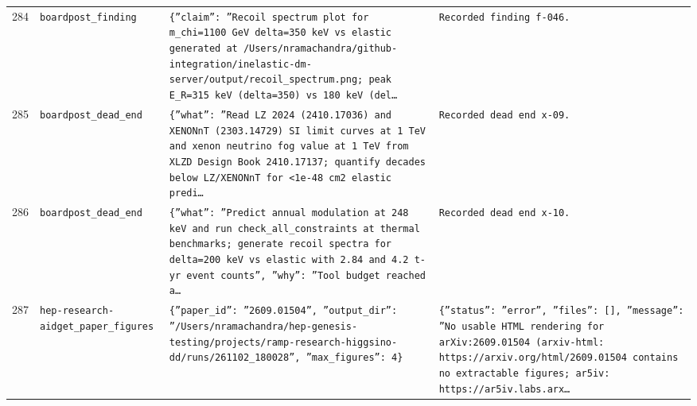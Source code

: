 \documentclass[11pt,a4paper]{article}
\begin{document}
\begin{longtable}{@{}p{}p{}p{}p{}@{}}
284 & \texttt{board}\newline\texttt{post\_\allowbreak{}finding} & \texttt{\{''claim'':\allowbreak{} ''Recoil spectrum plot for m\_\allowbreak{}chi=\allowbreak{}1100 GeV delta=\allowbreak{}350 keV vs elastic generated at /\allowbreak{}Users/\allowbreak{}nramachandra/\allowbreak{}github-integration/\allowbreak{}inelastic-dm-server/\allowbreak{}output/\allowbreak{}recoil\_\allowbreak{}spectrum.png;\allowbreak{} peak E\_\allowbreak{}R=\allowbreak{}315 keV (delta=\allowbreak{}350)\allowbreak{} vs 180 keV (del\ldots{}\allowbreak{}} & \texttt{Recorded finding f-046.} \\
285 & \texttt{board}\newline\texttt{post\_\allowbreak{}dead\_\allowbreak{}end} & \texttt{\{''what'':\allowbreak{} ''Read LZ 2024 (2410.17036)\allowbreak{} and XENONnT (2303.14729)\allowbreak{} SI limit curves at 1 TeV and xenon neutrino fog value at 1 TeV from XLZD Design Book 2410.17137;\allowbreak{} quantify decades below LZ/\allowbreak{}XENONnT for \textless{}\allowbreak{}1e-48 cm2 elastic predi\ldots{}\allowbreak{}} & \texttt{Recorded dead end x-09.} \\
286 & \texttt{board}\newline\texttt{post\_\allowbreak{}dead\_\allowbreak{}end} & \texttt{\{''what'':\allowbreak{} ''Predict annual modulation at 248 keV and run check\_\allowbreak{}all\_\allowbreak{}constraints at thermal benchmarks;\allowbreak{} generate recoil spectra for delta=\allowbreak{}200 keV vs elastic with 2.84 and 4.2 t-yr event counts'',\allowbreak{} ''why'':\allowbreak{} ''Tool budget reached a\ldots{}\allowbreak{}} & \texttt{Recorded dead end x-10.} \\
287 & \texttt{hep-research-aid}\newline\texttt{get\_\allowbreak{}paper\_\allowbreak{}figures} & \texttt{\{''paper\_\allowbreak{}id'':\allowbreak{} ''2609.01504'',\allowbreak{} ''output\_\allowbreak{}dir'':\allowbreak{} ''/\allowbreak{}Users/\allowbreak{}nramachandra/\allowbreak{}hep-genesis-testing/\allowbreak{}projects/\allowbreak{}ramp-research-higgsino-dd/\allowbreak{}runs/\allowbreak{}261102\_\allowbreak{}180028'',\allowbreak{} ''max\_\allowbreak{}figures'':\allowbreak{} 4\}\allowbreak{}} & \texttt{\{''status'':\allowbreak{} ''error'',\allowbreak{} ''files'':\allowbreak{} []\allowbreak{},\allowbreak{} ''message'':\allowbreak{} ''No usable HTML rendering for arXiv:\allowbreak{}2609.01504 (arxiv-html:\allowbreak{} https:\allowbreak{}/\allowbreak{}/\allowbreak{}arxiv.org/\allowbreak{}html/\allowbreak{}2609.01504 contains no extractable figures;\allowbreak{} ar5iv:\allowbreak{} https:\allowbreak{}/\allowbreak{}/\allowbreak{}ar5iv.labs.arx\ldots{}\allowbreak{}} \\

\end{longtable}
\end{document}
